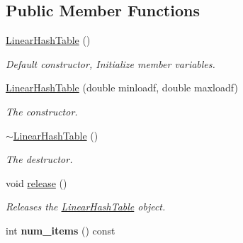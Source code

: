 \subsection*{Public Member Functions}
\begin{CompactItemize}
\item 
\hypertarget{classLinearHashTable_bf7283c1702c43b8a8ea62974c4f8c3b}{
\hyperlink{classLinearHashTable_bf7283c1702c43b8a8ea62974c4f8c3b}{LinearHashTable} ()}
\label{classLinearHashTable_bf7283c1702c43b8a8ea62974c4f8c3b}

\begin{CompactList}\small\item\em Default constructor, Initialize member variables. \item\end{CompactList}\item 
\hypertarget{classLinearHashTable_71ba4421ab8d3e78ac12b1bbf064c339}{
\hyperlink{classLinearHashTable_71ba4421ab8d3e78ac12b1bbf064c339}{LinearHashTable} (double minloadf, double maxloadf)}
\label{classLinearHashTable_71ba4421ab8d3e78ac12b1bbf064c339}

\begin{CompactList}\small\item\em The constructor. \item\end{CompactList}\item 
\hypertarget{classLinearHashTable_5ebdebd06837f32e434a7ce7d2ce8897}{
\hyperlink{classLinearHashTable_5ebdebd06837f32e434a7ce7d2ce8897}{$\sim$LinearHashTable} ()}
\label{classLinearHashTable_5ebdebd06837f32e434a7ce7d2ce8897}

\begin{CompactList}\small\item\em The destructor. \item\end{CompactList}\item 
\hypertarget{classLinearHashTable_5072a29db252e08a74a65a7f8b12c8a6}{
void \hyperlink{classLinearHashTable_5072a29db252e08a74a65a7f8b12c8a6}{release} ()}
\label{classLinearHashTable_5072a29db252e08a74a65a7f8b12c8a6}

\begin{CompactList}\small\item\em Releases the \hyperlink{classLinearHashTable}{LinearHashTable} object. \item\end{CompactList}\item 
\hypertarget{classLinearHashTable_a8853f851d5439c3e2c13f61af532e9a}{
int \textbf{num\_\-items} () const }
\label{classLinearHashTable_a8853f851d5439c3e2c13f61af532e9a}


\end{CompactItemize}
